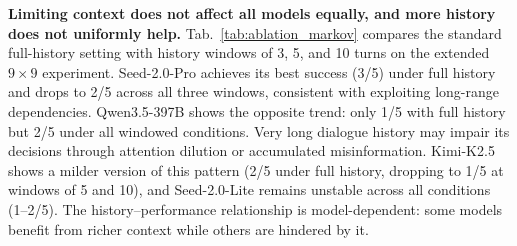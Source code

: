 \noindent\textbf{Limiting context does not affect all models equally, and more history does not uniformly help.}\label{sec:appendix_markov}
Tab.~\ref{tab:ablation_markov} compares the standard full-history setting with history windows of 3, 5, and 10 turns on the extended $9{\times}9$ experiment. Seed-2.0-Pro achieves its best success (3/5) under full history and drops to 2/5 across all three windows, consistent with exploiting long-range dependencies. Qwen3.5-397B shows the opposite trend: only 1/5 with full history but 2/5 under all windowed conditions. Very long dialogue history may impair its decisions through attention dilution or accumulated misinformation. Kimi-K2.5 shows a milder version of this pattern (2/5 under full history, dropping to 1/5 at windows of 5 and 10), and Seed-2.0-Lite remains unstable across all conditions (1--2/5). The history--performance relationship is model-dependent: some models benefit from richer context while others are hindered by it.



